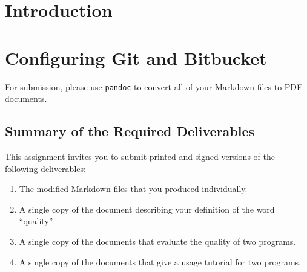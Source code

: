 

\usepackage[compact]{titlesec}



\section*{Introduction}


\section*{Configuring Git and Bitbucket}

For submission, please use {\tt pandoc} to convert all of your Markdown files to PDF documents.

\subsection*{Summary of the Required Deliverables}

This assignment invites you to submit printed and signed versions of the following deliverables:

\vspace*{-.1in}
\begin{enumerate}
  \setlength{\itemsep}{0in}
  \item The modified Markdown files that you produced individually.
  \item A single copy of the document describing your definition of the word ``quality''.
  \item A single copy of the documents that evaluate the quality of two programs.
  \item A single copy of the documents that give a usage tutorial for two programs.
\end{enumerate}
\vspace*{-.1in}


